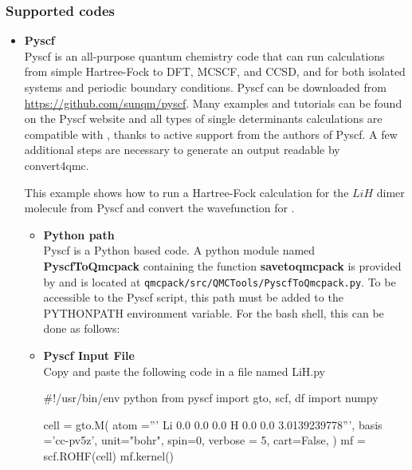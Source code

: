 \subsubsection{Supported codes}

\begin{itemize}
\item \textbf{Pyscf}\\

Pyscf\cite{Sun2018} is an all-purpose quantum chemistry code that can
run calculations from simple Hartree-Fock to DFT, MCSCF, and CCSD, and
for both isolated systems and periodic boundary conditions. Pyscf can
be downloaded from \url{https://github.com/sunqm/pyscf}. Many examples
and tutorials can be found on the Pyscf website and all types of
single determinants calculations are compatible with \qmcpack, thanks
to active support from the authors of Pyscf. A few additional steps
are necessary to generate an output readable by convert4qmc.


This example shows how to run a Hartree-Fock calculation for the $LiH$
dimer molecule from Pyscf and convert the wavefunction for \qmcpack.\\

\begin{itemize}
 \item \textbf{Python path}\\
Pyscf is a Python based code. A python module named \textbf{PyscfToQmcpack} containing the function \textbf{savetoqmcpack} is provided by \qmcpack and is located at \texttt{qmcpack/src/QMCTools/PyscfToQmcpack.py}.
To be accessible to the Pyscf script, this path must be added to the PYTHONPATH environment variable.
For the bash shell, this can be done as follows:\\


 \item \textbf{Pyscf Input File}\\
 
Copy and paste the following code in a file named LiH.py

\begin{shade}
#!/usr/bin/env python
from pyscf import gto, scf, df
import numpy

cell = gto.M(
   atom ='''
Li 0.0 0.0 0.0
H  0.0 0.0 3.0139239778''',
   basis ='cc-pv5z',
   unit="bohr",
   spin=0,
   verbose = 5,
   cart=False,
)
mf = scf.ROHF(cell)
mf.kernel()


\end{shade}
\end{itemize}
\end{itemize}
